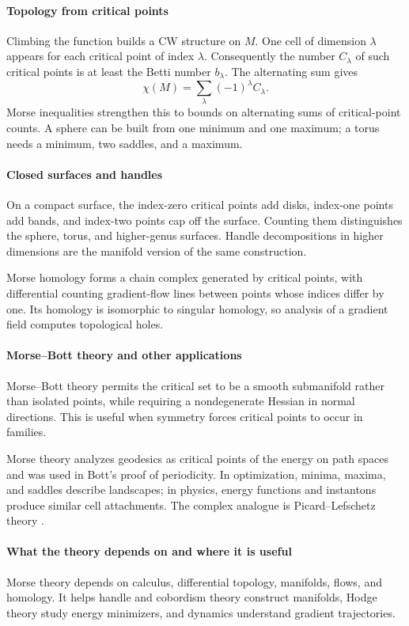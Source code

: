 \paragraph{Topology from critical points}
Climbing the function builds a CW structure on $M$. One cell of dimension $\lambda$ appears for each critical point of index $\lambda$. Consequently the number $C_\lambda$ of such critical points is at least the Betti number $b_\lambda$. The alternating sum gives
\[
\chi(M)=\sum_\lambda(-1)^\lambda C_\lambda.
\]
Morse inequalities strengthen this to bounds on alternating sums of critical-point counts. A sphere can be built from one minimum and one maximum; a torus needs a minimum, two saddles, and a maximum.

\paragraph{Closed surfaces and handles}
On a compact surface, the index-zero critical points add disks, index-one points add bands, and index-two points cap off the surface. Counting them distinguishes the sphere, torus, and higher-genus surfaces. Handle decompositions in higher dimensions are the manifold version of the same construction.

Morse homology forms a chain complex generated by critical points, with differential counting gradient-flow lines between points whose indices differ by one. Its homology is isomorphic to singular homology, so analysis of a gradient field computes topological holes.

\paragraph{Morse--Bott theory and other applications}
Morse--Bott theory permits the critical set to be a smooth submanifold rather than isolated points, while requiring a nondegenerate Hessian in normal directions. This is useful when symmetry forces critical points to occur in families.

Morse theory analyzes geodesics as critical points of the energy on path spaces and was used in Bott's proof of periodicity. In optimization, minima, maxima, and saddles describe landscapes; in physics, energy functions and instantons produce similar cell attachments. The complex analogue is Picard--Lefschetz theory \cite{morse_theory_ref2}.

\paragraph{What the theory depends on and where it is useful}
Morse theory depends on calculus, differential topology, manifolds, flows, and homology. It helps handle and cobordism theory construct manifolds, Hodge theory study energy minimizers, and dynamics understand gradient trajectories.

